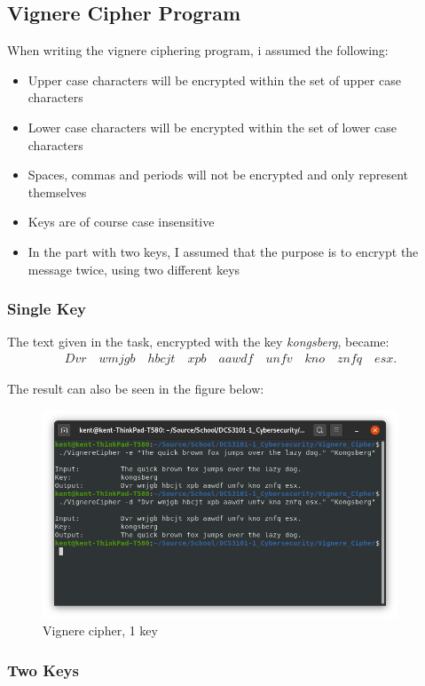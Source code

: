 \documentclass{article}
\begin{document}
\subsection{Vignere Cipher Program}

When writing the vignere ciphering program, i assumed the following:
\begin{itemize}
\item{Upper case characters will be encrypted within the set of upper case characters}
\item{Lower case characters will be encrypted within the set of lower case characters}
\item{Spaces, commas and periods will not be encrypted and only represent themselves}
\item{Keys are of course case insensitive}
\item{In the part with two keys, I assumed that the purpose is to encrypt the message twice, using two different keys}
\end{itemize}

\subsubsection{Single Key}

The text given in the task, encrypted with the key \textit{kongsberg}, became:
\begin{align*}
Dvr\quad wmjgb\quad hbcjt\quad xpb\quad aawdf\quad unfv\quad kno\quad znfq\quad esx.
\end{align*}

The result can also be seen in the figure below:

\begin{figure}[H]
 \centering
  \includegraphics[width=300pt]{img/vignere1key.png}
 \caption{Vignere cipher, 1 key}
 \end{figure}

\subsubsection{Two Keys}
\end{document}
